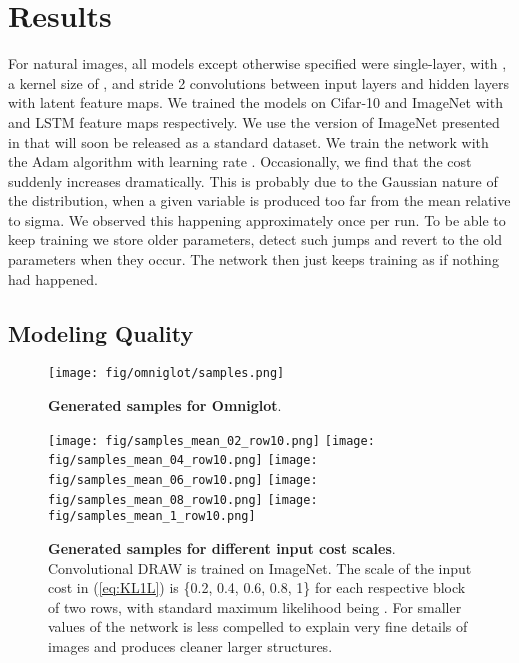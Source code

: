 \documentclass{article}
\begin{document}
\section{Results}

For natural images, all models except otherwise specified were single-layer, with , a kernel size of , and stride 2 convolutions between input layers and hidden layers with  latent feature maps.
We trained the models on Cifar-10 and ImageNet with  and  LSTM feature maps respectively. We use the version of ImageNet presented in \citep{oord2016pixel} that will soon be released as a standard dataset. We train the network with the Adam algorithm \citep{kingma2014adam} with learning rate . Occasionally, we find that the cost suddenly increases dramatically. This is probably due to the Gaussian nature of the distribution, when a given variable is produced too far from the mean relative to sigma. We observed this happening approximately once per run. To be able to keep training we store older parameters, detect such jumps and revert to the old parameters when they occur. The network then just keeps training as if nothing had happened.

\subsection{Modeling Quality}



\begin{figure}[t]
\begin{center}
\begin{minipage}{0.5\textwidth}
\texttt{[image: fig/omniglot/samples.png]}
\caption{\textbf{Generated samples for Omniglot}. 
}
\label{fig:samplesOmniglot}
\end{minipage}
\end{center}
\vspace{-0.75cm}
\end{figure}

\begin{figure}[t]
\vspace{-.0cm}
\begin{center}
\begin{minipage}{0.5\textwidth}
\texttt{[image: fig/samples\_mean\_02\_row10.png]}
\texttt{[image: fig/samples\_mean\_04\_row10.png]}
\texttt{[image: fig/samples\_mean\_06\_row10.png]}
\texttt{[image: fig/samples\_mean\_08\_row10.png]}
\texttt{[image: fig/samples\_mean\_1\_row10.png]}
\caption{\textbf{Generated samples for different input cost scales}. Convolutional DRAW is trained on  ImageNet. The scale of the input cost  in (\ref{eq:KL1L}) is \{0.2, 0.4, 0.6, 0.8, 1\} for each respective block of two rows, with standard maximum likelihood being . For smaller values of  the network is less compelled to explain very fine details of images and produces cleaner larger structures. 
}
\label{fig:samples}
\end{minipage}
\end{center}
\end{figure}
\end{document}
